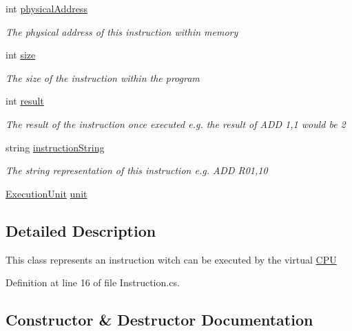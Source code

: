 \begin{DoxyCompactItemize}
int \hyperlink{class_c_p_u___o_s___simulator_1_1_c_p_u_1_1_instruction_a401c8f3740b63632e17db6f80b505a17}{physical\+Address}
\begin{DoxyCompactList}\small\item\em The physical address of this instruction within memory \end{DoxyCompactList}\item 
int \hyperlink{class_c_p_u___o_s___simulator_1_1_c_p_u_1_1_instruction_a8c533b0c08d8ac0a85b0e342f95cfeec}{size}
\begin{DoxyCompactList}\small\item\em The size of the instruction within the program \end{DoxyCompactList}\item 
int \hyperlink{class_c_p_u___o_s___simulator_1_1_c_p_u_1_1_instruction_a80637c7fae4090f9c73f468dbd6af7ee}{result}
\begin{DoxyCompactList}\small\item\em The result of the instruction once executed e.\+g. the result of A\+D\+D 1,1 would be 2 \end{DoxyCompactList}\item 
string \hyperlink{class_c_p_u___o_s___simulator_1_1_c_p_u_1_1_instruction_ab58373ca153de047b36c1036e07db7a8}{instruction\+String}
\begin{DoxyCompactList}\small\item\em The string representation of this instruction e.\+g. A\+D\+D R01,10 \end{DoxyCompactList}\item 
\hyperlink{class_c_p_u___o_s___simulator_1_1_c_p_u_1_1_execution_unit}{Execution\+Unit} \hyperlink{class_c_p_u___o_s___simulator_1_1_c_p_u_1_1_instruction_a0337c93fbfb5993eab37f1d052ca5f43}{unit}
\end{DoxyCompactItemize}


\subsection{Detailed Description}
This class represents an instruction witch can be executed by the virtual \hyperlink{namespace_c_p_u___o_s___simulator_1_1_c_p_u}{C\+P\+U} 



Definition at line 16 of file Instruction.\+cs.



\subsection{Constructor \& Destructor Documentation}
\hypertarget{class_c_p_u___o_s___simulator_1_1_c_p_u_1_1_instruction_a2038c543e7b47a5997405f56cb8c7aa9}{}
